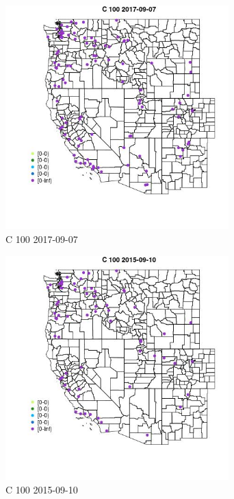 \begin{figure} 
\centering  
\includegraphics[width=0.77\textwidth]{Code_Outputs/Report_ML_input_PM25_Step4_part_e_de_duplicated_aveswNAs_MapObsC_1002017-09-07.jpg} 
\caption{\label{fig:Report_ML_input_PM25_Step4_part_e_de_duplicated_aveswNAsMapObsC_1002017-09-07}C 100 2017-09-07} 
\end{figure} 
 

\begin{figure} 
\centering  
\includegraphics[width=0.77\textwidth]{Code_Outputs/Report_ML_input_PM25_Step4_part_e_de_duplicated_aveswNAs_MapObsC_1002015-09-10.jpg} 
\caption{\label{fig:Report_ML_input_PM25_Step4_part_e_de_duplicated_aveswNAsMapObsC_1002015-09-10}C 100 2015-09-10} 
\end{figure} 
 

